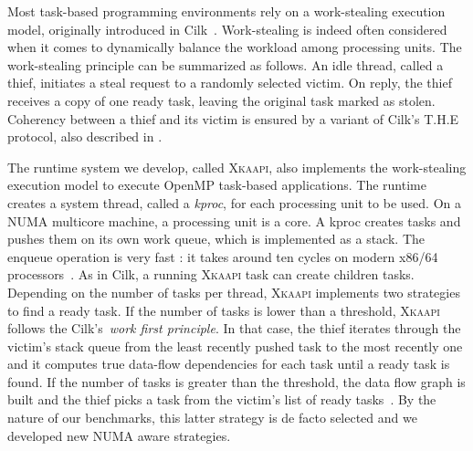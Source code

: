 \documentclass{Styles/llncs}
\newcommand{\kaapi}{\textsc{\mbox{Xkaapi}}\xspace}
\begin{document}
Most task-based programming environments rely on a work-stealing execution model, originally introduced in Cilk~\cite{cilk5}. 
Work-stealing is indeed often considered when it comes to dynamically balance the workload among processing units. 
The work-stealing principle can be summarized as follows. 
An idle thread, called a thief, initiates a steal request to a randomly selected victim. 
On reply, the thief receives a copy of one ready task, leaving the original task marked as stolen.
Coherency between a thief and its victim is ensured by a variant of Cilk's T.H.E protocol, also described in \cite{cilk5}.

The runtime system we develop, called \kaapi, also implements the work-stealing execution model to execute OpenMP task-based applications.
The runtime creates a system thread, called a \emph{kproc}, for each processing unit to be used.
On a NUMA multicore machine, a processing unit is a core.
A kproc creates tasks and pushes them on its own work queue, which is implemented as a stack.
The enqueue operation is very fast : it takes around ten cycles on modern x86/64 processors~\cite{libkomp}.
As in Cilk, a  running \kaapi task can create children tasks. 
Depending on the number of tasks per thread, \kaapi implements two strategies to find a ready task.
If the number of tasks is lower than a threshold, \kaapi follows the Cilk's~\textit{work first principle}. 
In that case, the thief iterates through the victim's stack queue from 
the least recently pushed task to the most recently one and it computes true
data-flow dependencies for each task until a ready task is found. If the number of tasks is greater than the threshold, 
the data flow graph is built and the thief picks a task from the victim's list of ready tasks~\cite{Bleuse2014}.
By the nature of our benchmarks, this latter strategy is de facto selected and we developed new NUMA aware strategies.


%
\end{document}
